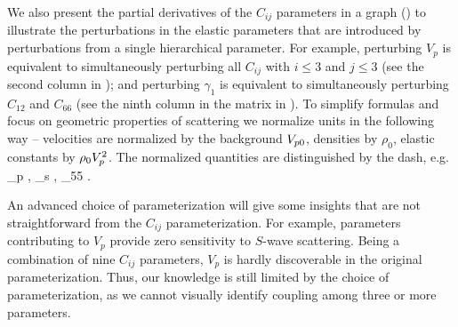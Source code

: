 \eeq
%
We also present the partial derivatives of the $C_{ij}$ parameters in a graph () to illustrate the perturbations in the elastic parameters that are introduced by perturbations from a single hierarchical parameter. For example, perturbing $V_p$ is equivalent to simultaneously perturbing all $C_{ij}$ with $i \leq 3$ and $j \leq 3$ (see the second column in ); and perturbing $\gamma_1$ is equivalent to simultaneously perturbing $C_{12}$ and $C_{66}$ (see the ninth column in the matrix in ). To simplify formulas and focus on geometric properties of scattering we normalize units in the following way -- velocities are normalized by the background $V_{p0}$, densities by $\rho_0$, elastic constants by $\rho_0 V_p^2$. The normalized quantities are distinguished by the dash, e.g.
\beq
\nmz{\v}_p \equiv {}, 
\nmz{\v}_s \equiv {},
_{55} \equiv {}. 
\eeq  



An advanced choice of parameterization will give some insights that are not straightforward from the $C_{ij}$ parameterization. For example, parameters contributing to $V_p$ provide zero sensitivity to $S$-wave scattering. Being a combination of nine $C_{ij}$ parameters, $V_p$ is hardly discoverable in the original parameterization. Thus, our knowledge is still limited by the choice of parameterization, as we cannot visually identify coupling among three or more parameters.
